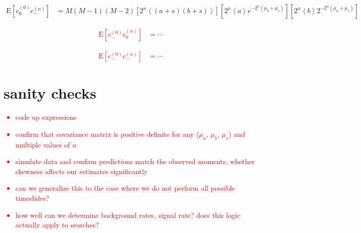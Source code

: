 \documentclass{article}
\begin{document}

\begin{align}
    \mathrm{E}[c_0^{(0)} c_-^{(n)}]
        & = M (M-1) (M-2) [2^n \left<(a+s)(b+s)\right>] [2^n \left<a\right> e^{-2^n(\mu_b+\mu_s)}] [2^n \left<b\right> 2^{-2^n(\mu_a+\mu_s)}]
\end{align}








\textcolor{red}{
\begin{align}
    \mathrm{E}[c_-^{(0)} c_0^{(n)}]
        & = \cdots %
\end{align}
}


















\textcolor{red}{
\begin{align}
    \mathrm{E}[c_-^{(0)} c_-^{(n)}]
        & = \cdots %
\end{align}
}










\section*{sanity checks}
\label{sec:checks}

\textcolor{red}{
\begin{itemize}
    \item code up expressions
    \item confirm that covariance matrix is positive definite for any ($\mu_a$, $\mu_b$, $\mu_s$) and multiple values of $n$
    \item simulate data and confirm predictions match the observed moments; whether skewness affects our estimates significantly
    \item can we generalize this to the case where we do not perform all possible timeslides?
    \item how well can we determine background rates, signal rate? does this logic actually apply to searches?
\end{itemize}
}

\end{document}
